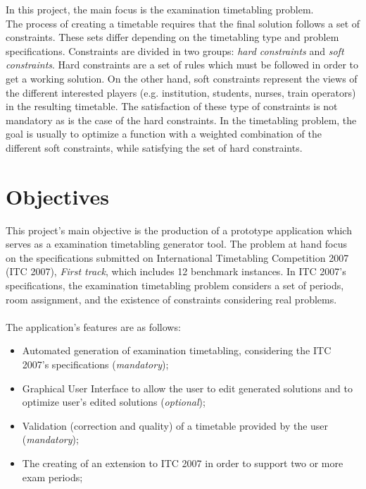 In this project, the main focus is the examination timetabling problem. \\

The process of creating a timetable requires that the final solution follows a set of constraints. These sets differ depending on the timetabling type and problem specifications. Constraints are divided in two groups: \textit{hard constraints} and \textit{soft constraints}. Hard constraints are a set of rules which must be followed in order to get a working solution. On the other hand, soft constraints represent the views of the different interested players (e.g. institution, students, nurses, train operators) in the resulting timetable. The satisfaction of these type of constraints is not mandatory as is the case of the hard constraints. In the timetabling problem, the goal is usually to optimize a function with a weighted combination of the different soft constraints, while satisfying the set of hard constraints. 

\section{Objectives}
\label{section:Objts}

This project's main objective is the production of a prototype application which serves as a examination timetabling generator tool. The problem at hand focus on the specifications submitted on International Timetabling Competition 2007 (ITC 2007), \textit{First track}, which includes 12 benchmark instances. In ITC 2007's specifications, the examination timetabling problem considers a set of periods, room assignment, and the existence of constraints considering real problems.\\
\\
The application's features are as follows:

\begin{itemize}
	\item Automated generation of examination timetabling, considering the ITC 2007's specifications (\textit{mandatory});
	\item Graphical User Interface to allow the user to edit generated solutions and to optimize user's edited solutions (\textit{optional});
	\item Validation (correction and quality) of a timetable provided by the user (\textit{mandatory});
	\item The creating of an extension to ITC 2007 in order to support two or more exam periods;
\end{itemize}

